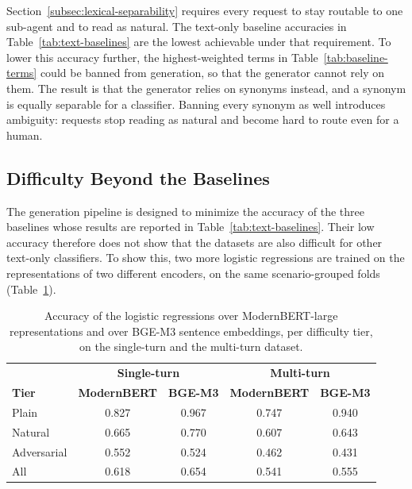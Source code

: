 Section~\ref{subsec:lexical-separability} requires every request to stay routable to one sub-agent and to read as natural. The text-only baseline accuracies in Table~\ref{tab:text-baselines} are the lowest achievable under that requirement. To lower this accuracy further, the highest-weighted terms in Table~\ref{tab:baseline-terms} could be banned from generation, so that the generator cannot rely on them. The result is that the generator relies on synonyms instead, and a synonym is equally separable for a classifier. Banning every synonym as well introduces ambiguity: requests stop reading as natural and become hard to route even for a human.

\subsection{Difficulty Beyond the Baselines}
\label{subsec:encoder-robustness}

The generation pipeline is designed to minimize the accuracy of the three baselines whose results are reported in Table~\ref{tab:text-baselines}. Their low accuracy therefore does not show that the datasets are also difficult for other text-only classifiers. To show this, two more logistic regressions are trained on the representations of two different encoders, on the same scenario-grouped folds (Table~\ref{tab:modernbert-baseline}).

\begin{table}[H]
    \centering
    \small
    \begin{tabular}{@{}l|cc|cc@{}}
        \toprule
        & \multicolumn{2}{c|}{\textbf{Single-turn}} & \multicolumn{2}{c}{\textbf{Multi-turn}} \\
        \textbf{Tier} & \textbf{ModernBERT} & \textbf{BGE-M3} & \textbf{ModernBERT} & \textbf{BGE-M3} \\
        \midrule
        Plain       & 0.827 & 0.967 & 0.747 & 0.940 \\
        Natural     & 0.665 & 0.770 & 0.607 & 0.643 \\
        Adversarial & 0.552 & 0.524 & 0.462 & 0.431 \\
        \midrule
        All         & 0.618 & 0.654 & 0.541 & 0.555 \\
        \bottomrule
    \end{tabular}
    \caption[ModernBERT-large and BGE-M3 accuracy by difficulty tier]{Accuracy of the logistic regressions over ModernBERT-large representations and over BGE-M3 sentence embeddings, per difficulty tier, on the single-turn and the multi-turn dataset.}
    \label{tab:modernbert-baseline}
\end{table}


